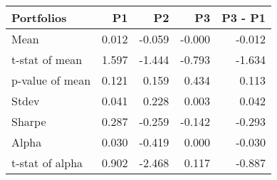 \begin{tabular}{lrrrr}
\toprule
Portfolios & P1 & P2 & P3 & P3 - P1 \\
\midrule
Mean & 0.012 & -0.059 & -0.000 & -0.012 \\
t-stat of mean & 1.597 & -1.444 & -0.793 & -1.634 \\
p-value of mean & 0.121 & 0.159 & 0.434 & 0.113 \\
Stdev & 0.041 & 0.228 & 0.003 & 0.042 \\
Sharpe & 0.287 & -0.259 & -0.142 & -0.293 \\
Alpha & 0.030 & -0.419 & 0.000 & -0.030 \\
t-stat of alpha & 0.902 & -2.468 & 0.117 & -0.887 \\
\bottomrule
\end{tabular}
